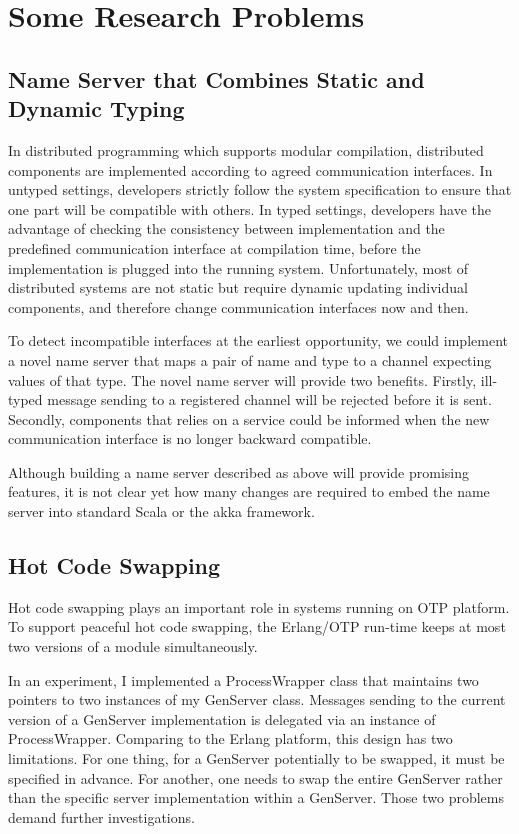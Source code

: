 \section{Some Research Problems}
\label{problems}

\subsection{Name Server that Combines Static and Dynamic Typing}
In distributed programming which supports modular compilation, distributed components are implemented according to agreed communication interfaces.  In untyped settings, developers strictly follow the system specification to ensure that one part will be compatible with others.  In typed settings, developers have the advantage of checking the consistency between implementation and the predefined communication interface at compilation time, before the implementation is plugged into the running system.  Unfortunately, most of distributed systems are not static but require dynamic updating individual components, and therefore change communication interfaces now and then.  

To detect incompatible interfaces at the earliest opportunity, we could implement a novel name server that maps a pair of name and type to a channel expecting values of that type.  The novel name server will provide two benefits.  Firstly, ill-typed message sending to a registered channel will be rejected before it is sent.  Secondly, components that relies on a service could be informed when the new communication interface is no longer backward compatible.

Although building a name server described as above will provide promising features, it is not clear yet how many changes are required to embed the name server into standard Scala or the akka framework.

\subsection{Hot Code Swapping}
Hot code swapping plays an important role in systems running on OTP platform.  To support peaceful hot code swapping, the Erlang/OTP run-time keeps at most two versions of a module simultaneously.

In an experiment, I implemented a ProcessWrapper class that maintains two pointers to two instances of my GenServer class.  Messages sending to the current version of a GenServer implementation is delegated via an instance of ProcessWrapper.  Comparing to the Erlang platform, this design has two limitations.  For one thing, for a GenServer potentially to be swapped, it must be specified in advance.  For another, one needs to swap the entire GenServer rather than the specific server implementation within a GenServer.  Those two problems demand further investigations.

